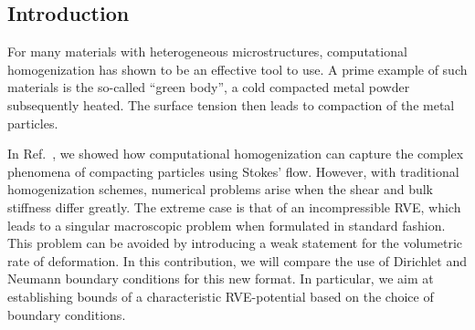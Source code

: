 \documentclass[notitlepage,a4paper,fleqn,9pt]{extarticle}
\begin{document}
\begin{multicols}{2}

\section{Introduction}

For many materials with heterogeneous microstructures, computational homogenization has shown to be an effective tool to use.
A prime example of such materials is the so-called ``green body'', a cold compacted metal powder subsequently heated. The surface tension then leads to compaction of the metal particles. 

In Ref.~\cite{Ohman2012a}, we showed how computational homogenization can capture the complex phenomena of compacting particles using Stokes' flow.
However, with traditional homogenization schemes, numerical problems arise when the shear and bulk stiffness differ greatly.
The extreme case is that of an incompressible RVE, which leads to a singular macroscopic problem when formulated in standard fashion.
This problem can be avoided by introducing a weak statement for the volumetric rate of deformation. 
In this contribution, we will compare the use of Dirichlet and Neumann boundary conditions for this new format.
In particular, we aim at establishing bounds of a characteristic RVE-potential based on the choice of boundary conditions.


\end{multicols}
\end{document}

